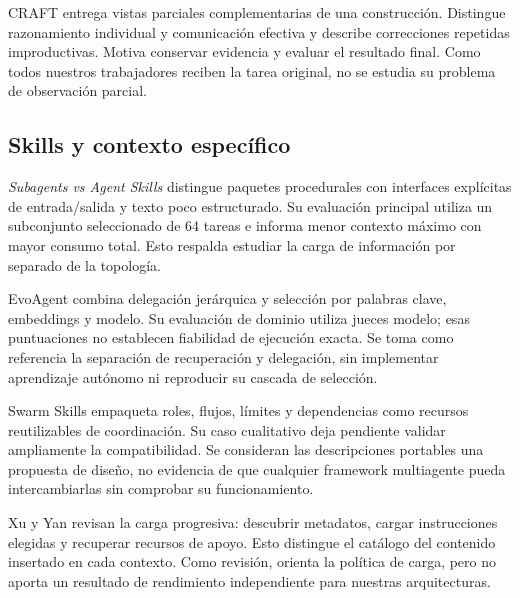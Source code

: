 CRAFT entrega vistas parciales complementarias de una construcción. Distingue razonamiento individual y comunicación efectiva y describe correcciones repetidas improductivas. Motiva conservar evidencia y evaluar el resultado final. Como todos nuestros trabajadores reciben la tarea original, no se estudia su problema de observación parcial.

\subsection{Skills y contexto específico}
\textit{Subagents vs Agent Skills} distingue paquetes procedurales con interfaces explícitas de entrada/salida y texto poco estructurado. Su evaluación principal utiliza un subconjunto seleccionado de 64 tareas e informa menor contexto máximo con mayor consumo total. Esto respalda estudiar la carga de información por separado de la topología.

EvoAgent combina delegación jerárquica y selección por palabras clave, embeddings y modelo. Su evaluación de dominio utiliza jueces modelo; esas puntuaciones no establecen fiabilidad de ejecución exacta. Se toma como referencia la separación de recuperación y delegación, sin implementar aprendizaje autónomo ni reproducir su cascada de selección.

Swarm Skills empaqueta roles, flujos, límites y dependencias como recursos reutilizables de coordinación. Su caso cualitativo deja pendiente validar ampliamente la compatibilidad. Se consideran las descripciones portables una propuesta de diseño, no evidencia de que cualquier framework multiagente pueda intercambiarlas sin comprobar su funcionamiento.

Xu y Yan revisan la carga progresiva: descubrir metadatos, cargar instrucciones elegidas y recuperar recursos de apoyo. Esto distingue el catálogo del contenido insertado en cada contexto. Como revisión, orienta la política de carga, pero no aporta un resultado de rendimiento independiente para nuestras arquitecturas.
